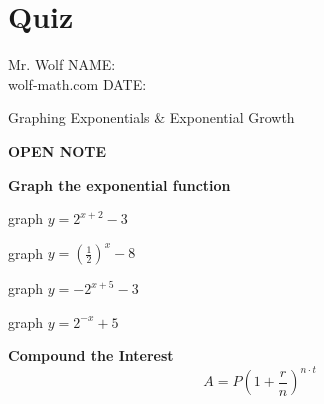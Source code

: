 \documentclass[12pt]{article}
\begin{document}
\pagebreak

\section{Quiz}

Mr. Wolf \hfill NAME:\underline{\hspace{3in}}\\ 
wolf-math.com \hfill DATE:\underline{\hspace{2in}}\\


\begin{center}
	\begin{Large}

		 Graphing Exponentials \& Exponential Growth\\

	\end{Large}
	
		\textbf{OPEN NOTE} \\
\end{center}


\textbf{Graph the exponential function}\\

\begin{enumerate}[resume]
\begin{multicols}{2}

\item graph $y=2^{x+2}-3$\\

\graph

\item graph $y=\left(\frac{1}{2} \right)^{x}-8$\\

\graph

\item graph $y=-2^{x+5}-3$\\

\graph

\item  graph $y=2^{-x}+5$\\

\graph

\end{multicols}

\end{enumerate}

\hrulefill

\textbf{Compound the Interest}\\

$$A=P\left(1+\frac{r}{n}\right)^{n \cdot t}$$
\end{document}

